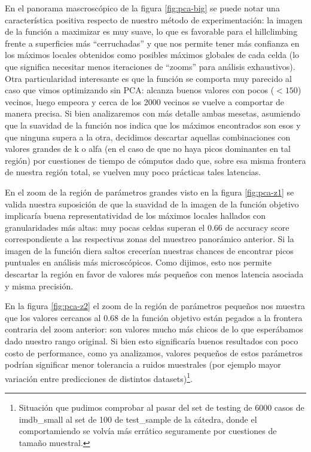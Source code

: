 En el panorama mascroscópico de la figura \ref{fig:pca-big} se puede notar una característica positiva respecto de nuestro método de experimentación: la imagen de la función a maximizar es muy suave, lo que es favorable para el hillclimbing frente a superficies más ``cerruchadas'' y que nos permite tener más confianza en los máximos locales obtenidos como posibles máximos globales de cada celda (lo que significa necesitar menos iteraciones de ``zooms'' para análisis exhaustivos). Otra particularidad interesante es que la función se comporta muy parecido al caso que vimos optimizando sin PCA: alcanza buenos valores con pocos ($<150$) vecinos, luego empeora y cerca de los 2000 vecinos se vuelve a comportar de manera precisa. Si bien analizaremos con más detalle ambas mesetas, asumiendo que la suavidad de la función nos indica que los máximos encontrados son esos y que ninguna supera a la otra, decidimos descartar aquellas combinaciones con valores grandes de k o alfa (en el caso de que no haya picos dominantes en tal región) por cuestiones de tiempo de cómputos dado que, sobre esa misma frontera de nuestra región total, se vuelven muy poco prácticas tales latencias.

En el zoom de la región de parámetros grandes visto en la figura \ref{fig:pca-z1} se valida nuestra suposición de que la suavidad de la imagen de la función objetivo implicaría buena representatividad de los máximos locales hallados con granularidades más altas: muy pocas celdas superan el $0.66$ de accuracy score correspondiente a las respectivas zonas del muestreo panorámico anterior. Si la imagen de la función diera saltos crecerían nuestras chances de encontrar picos puntuales en análisis más microscópicos. Como dijimos, esto nos permite descartar la región en favor de valores más pequeños con menos latencia asociada y misma precisión.

En la figura \ref{fig:pca-z2} el zoom de la región de parámetros pequeños nos muestra que los valores cercanos al 0.68 de la función objetivo están pegados a la frontera contraria del zoom anterior: son valores mucho más chicos de lo que esperábamos dado nuestro rango original. Si bien esto significaría buenos resultados con poco costo de performance, como ya analizamos, valores pequeños de estos parámetros podrían significar menor tolerancia a ruidos muestrales (por ejemplo mayor variación entre predicciones de distintos datasets)\footnote{Situación que pudimos comprobar al pasar del set de testing de 6000 casos de imdb\_small al set de 100 de test\_sample de la cátedra, donde el comportamiendo se volvía más errático seguramente por cuestiones de tamaño muestral.}.

